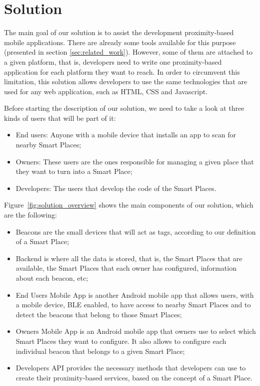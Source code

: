 
\section{Solution}
\label{sec:solution}
The main goal of our solution is to assist
the development proximity-based mobile applications.
There are already some tools available for this purpose (presented in section \ref{sec:related_work}).
However, some of them are attached to a given platform, that is, developers
need to write one proximity-based application for each platform they want
to reach.
In order to circumvent this limitation, this solution allows developers
to use the same technologies that are used for any web application, such as \gls{HTML}, \gls{CSS} and Javascript.

Before starting the description of our solution, we need to take a look at three kinds of users that will be part of it:
\begin{itemize}
  \item End users: Anyone with a mobile device that installs an app to scan for nearby Smart Places;
  \item Owners: These users are the ones responsible for managing a given place that they want to turn into a Smart Place;
  \item Developers: The users that develop the code of the Smart Places.
\end{itemize}
Figure~\ref{fig:solution_overview} shows the main components of our solution, which are the following:
\begin{itemize}
  \item Beacons
  are the small devices that will act as tags, according to our definition of a Smart Place;
  \item Backend
  is where all the data is stored, that is, the Smart Places that are available, the Smart Places that each owner has configured, information about each beacon, etc;
  \item End Users Mobile App
  is another Android mobile app that allows users, with a mobile device, \gls{BLE} enabled, to have access to nearby Smart Places and to detect the beacons that belong to those Smart Places;
  \item Owners Mobile App
  is an Android mobile app that owners use to select which Smart Places they want to configure. It also allows to configure each individual beacon that belongs to a given Smart Place;
  \item Developers \gls{API} provides the necessary methods that developers can use to create their proximity-based services, based on the concept of a Smart Place.
\end{itemize}

